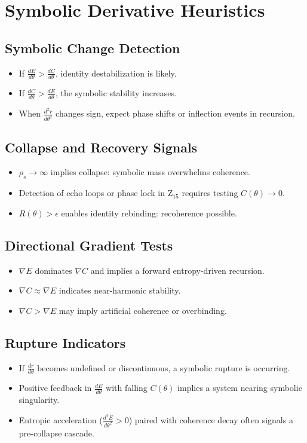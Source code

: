 \documentclass[12pt]{article}
\begin{document}
\section{Symbolic Derivative Heuristics}

\subsection*{Symbolic Change Detection}
\begin{itemize}
  \item If $\frac{dE}{d\theta} > \frac{dC}{d\theta}$, identity destabilization is likely.
  \item If $\frac{dC}{d\theta} > \frac{dE}{d\theta}$, the symbolic stability increases.
  \item When $\frac{d^2r}{d\theta^2}$ changes sign, expect phase shifts or inflection events in recursion.
\end{itemize}

\subsection*{Collapse and Recovery Signals}
\begin{itemize}
  \item $\rho_s \to \infty$ implies collapse: symbolic mass overwhelms coherence.
  \item Detection of echo loops or phase lock in Z$_{15}$ requires testing $C(\theta) \to 0$.
  \item $R(\theta) > \epsilon$ enables identity rebinding: recoherence possible.
\end{itemize}

\subsection*{Directional Gradient Tests}
\begin{itemize}
  \item $\nabla E$ dominates $\nabla C$ and implies a forward entropy-driven recursion.
  \item $\nabla C \approx \nabla E$ indicates near-harmonic stability.
  \item $\nabla C > \nabla E$ may imply artificial coherence or overbinding.
\end{itemize}

\subsection*{Rupture Indicators}
\begin{itemize}
  \item If $\frac{dr}{d\theta}$ becomes undefined or discontinuous, a symbolic rupture is occurring.
  \item Positive feedback in $\frac{dE}{d\theta}$ with falling $C(\theta)$ implies a system nearing symbolic singularity.
  \item Entropic acceleration ($\frac{d^2E}{d\theta^2} > 0$) paired with coherence decay often signals a pre-collapse cascade.
\end{itemize}
\end{document}

